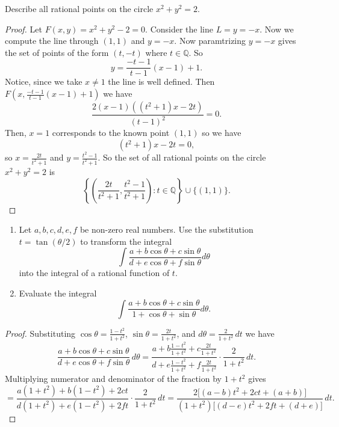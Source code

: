 \begin{tcolorbox}[title=Problem 5, breakable]
    Describe all rational points on the 
        circle $x^2 + y^2 = 2$.
\end{tcolorbox}

\begin{proof}
    Let $F(x, y) = x^2 + y^2 - 2 = 0$.
    Consider the line $L = y = -x$.
    Now we compute the line through $(1, 1)$ and $y = -x$.
    Now paramtrizing $y = -x$ gives the set of points of the form $(t, -t)$ where $t \in \mathbb{Q}$.
    So 
    \[y = \frac{-t - 1}{t - 1}(x - 1) + 1.\]
    Notice, since we take $x \ne 1$ the line is well defined.
    Then $F\left(x, \frac{-t - 1}{t - 1}(x - 1) + 1\right)$ we have 
    \[\frac{2(x - 1)((t^2 + 1)x - 2t)}{(t - 1)^2} = 0.\]
    Then, $x = 1$ corresponds to the known point $(1, 1)$ so we have 
    \[(t^2 + 1)x - 2t = 0,\]
    so $x = \frac{2t}{t^2 + 1}$ and $y = \frac{t^2 - 1}{t^2 + 1}$.
    So the set of all rational points on the circle $x^2 + y^2 = 2$ is 
    \[
    \left\{
    \left(\frac{2t}{t^2 + 1}, \frac{t^2 - 1}{t^2 + 1}\right)
    : t \in \mathbb{Q}
    \right\}
    \cup \{(1, 1)\}.
    \]
\end{proof}

\newpage
\begin{tcolorbox}[title=Problem 6, breakable]
    \begin{enumerate}
        \item     Let $a, b, c, d, e, f$ be non-zero real numbers.
    Use the substitution $t = \tan(\theta/2)$ to transform the integral 
    \[\int  \frac{a + b \cos \theta + c \sin \theta}{d + e \cos \theta + f \sin \theta} d\theta\]
    into the integral of a rational function of $t$.
        \item Evaluate the integral 
        \[
        \int  \frac{a + b \cos \theta + c \sin \theta}{1 + \cos \theta + \sin \theta} d \theta.
        \]
    \end{enumerate}
\end{tcolorbox}

\begin{proof}
    Substituting $\cos \theta = \frac{1 - t^2}{1 + t^2}$, $\sin \theta = \frac{2t}{1 + t^2}$, and $d\theta = \frac{2}{1 + t^2} \, dt$ we have
    \[
        \frac{a + b \cos \theta + c \sin \theta}{d + e \cos \theta + f \sin \theta} \, d\theta
        = \frac{a + b \frac{1 - t^2}{1 + t^2} + c \frac{2t}{1 + t^2}}{d + e \frac{1 - t^2}{1 + t^2} + f \frac{2t}{1 + t^2}} \cdot \frac{2}{1 + t^2} \, dt.
    \]
    Multiplying numerator and denominator of the fraction by $1 + t^2$ gives
    \[
        = \frac{a(1 + t^2) + b(1 - t^2) + 2ct}{d(1 + t^2) + e(1 - t^2) + 2ft} \cdot \frac{2}{1 + t^2} \, dt
        = \frac{2\bigl[(a - b)t^2 + 2ct + (a + b)\bigr]}{(1 + t^2)\bigl[(d - e)t^2 + 2ft + (d + e)\bigr]} \, dt.
    \]
\end{proof}

